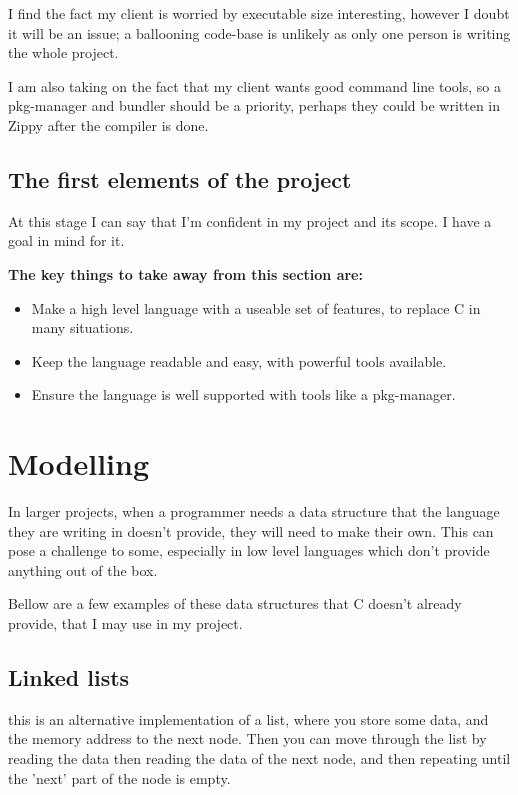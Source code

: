 \documentclass[a4paper,12pt]{article}
\begin{document}
{I find the fact my client is worried by executable size interesting, however
I doubt it will be an issue; a ballooning code-base is unlikely as only one 
person is writing the whole project.

I am also taking on the fact that my client wants good command line tools,
so a pkg-manager and bundler should be a priority, perhaps they could be 
written in Zippy after the compiler is done.

\subsection{The first elements of the project}
At this stage I can say that I'm confident in my project and its scope. I
have a goal in mind for
it.

\textbf{The key things to take away from this section are:}

\begin{itemize}
	\item
		Make a high level language with a useable set of features, to
		replace C in many situations.

	\item
		Keep the language readable and easy, with powerful tools available.

	\item
		Ensure the language is well supported with tools like a pkg-manager.
\end{itemize}

\section{Modelling}
In larger projects, when a programmer needs a data structure that the language
they are writing in doesn't provide, they will need to make their own. This can pose a
challenge to some, especially in low level languages which don't provide anything 
out of the box. 

Bellow are a few examples of these data structures that C doesn't already provide,
that I may use in my project.
\subsection{Linked lists}
this is an alternative implementation of a list, where you store some data, and 
the memory address to the next node. Then you can move through the list by reading 
the data then reading the data of the next node, and then repeating until the 
'next' part of the node is empty.

}
\end{document}
